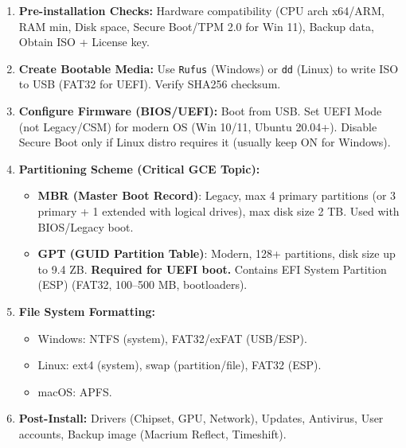 \documentclass[11pt]{article}
\newcommand{\cle}[1]{{\popxbold\color{popdark}#1}}
\begin{document}
\begin{methode}
\begin{enumerate}
\item \textbf{Pre-installation Checks:} Hardware compatibility (CPU arch x64/ARM, RAM min, Disk space, Secure Boot/TPM 2.0 for Win 11), Backup data, Obtain ISO + License key.
\item \textbf{Create Bootable Media:} Use \texttt{Rufus} (Windows) or \texttt{dd} (Linux) to write ISO to USB (FAT32 for UEFI). Verify SHA256 checksum.
\item \textbf{Configure Firmware (BIOS/UEFI):} Boot from USB. Set \cle{UEFI Mode} (not Legacy/CSM) for modern OS (Win 10/11, Ubuntu 20.04+). Disable Secure Boot only if Linux distro requires it (usually keep ON for Windows).
\item \textbf{Partitioning Scheme (Critical GCE Topic):}
\begin{itemize}
    \item \textbf{MBR (Master Boot Record)}: Legacy, max 4 primary partitions (or 3 primary + 1 extended with logical drives), max disk size 2 TB. Used with BIOS/Legacy boot.
    \item \textbf{GPT (GUID Partition Table)}: Modern, 128+ partitions, disk size up to 9.4 ZB. \textbf{Required for UEFI boot.} Contains \cle{EFI System Partition (ESP)} (FAT32, 100--500 MB, bootloaders).
\end{itemize}
\item \textbf{File System Formatting:}
\begin{itemize}
    \item Windows: \cle{NTFS} (system), \cle{FAT32/exFAT} (USB/ESP).
    \item Linux: \cle{ext4} (system), \cle{swap} (partition/file), \cle{FAT32} (ESP).
    \item macOS: \cle{APFS}.
\end{itemize}
\item \textbf{Post-Install:} Drivers (Chipset, GPU, Network), Updates, Antivirus, User accounts, Backup image (Macrium Reflect, Timeshift).
\end{enumerate}
\end{methode}
\end{document}
